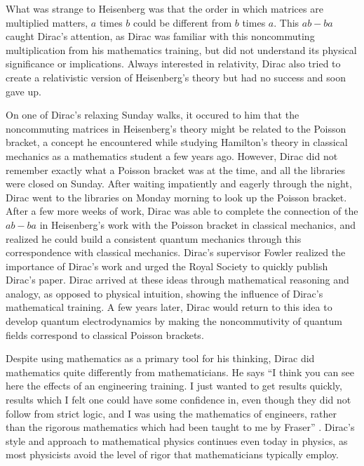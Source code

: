 \documentclass[12pt, oneside, letterpaper, fleqn]{article}
\begin{document}
What was strange to Heisenberg was that the order in which matrices are
multiplied matters, $a$ times $b$ could be different from $b$ times $a$.
This $ab - ba$ caught Dirac's attention, as Dirac was familiar with this
noncommuting multiplication from his mathematics training, but did not
understand its physical significance or implications. Always interested
in relativity, Dirac also tried to create a relativistic version of
Heisenberg's theory but had no success and soon gave up.

On one of Dirac's relaxing Sunday walks, it occured to him that the
noncommuting matrices in Heisenberg's theory might be related to the
Poisson bracket, a concept he encountered while studying Hamilton's
theory in classical mechanics as a mathematics student a few years ago.
However, Dirac did not remember exactly what a Poisson bracket was at
the time, and all the libraries were closed on Sunday. After waiting
impatiently and eagerly through the night, Dirac went to the libraries
on Monday morning to look up the Poisson bracket. After a few more weeks
of work, Dirac was able to complete the connection of the $ab - ba$ in
Heisenberg's work with the Poisson bracket in classical mechanics, and
realized he could build a consistent quantum mechanics through this
correspondence with classical mechanics. Dirac's supervisor Fowler
realized the importance of Dirac's work and urged the Royal Society to
quickly publish Dirac's paper. Dirac arrived at these ideas through
mathematical reasoning and analogy, as opposed to physical intuition,
showing the influence of Dirac's mathematical training. A few years
later, Dirac would return to this idea to develop quantum
electrodynamics by making the noncommutivity of quantum fields
correspond to classical Poisson brackets.

Despite using mathematics as a primary tool for his thinking, Dirac did
mathematics quite differently from mathematicians. He says ``I think you
can see here the effects of an engineering training. I just wanted to
get results quickly, results which I felt one could have some confidence
in, even though they did not follow from strict logic, and I was using
the mathematics of engineers, rather than the rigorous mathematics which
had been taught to me by Fraser'' \cite[pg. 95]{strangest_man}. Dirac's
style and approach to mathematical physics continues even today in
physics, as most physicists avoid the level of rigor that mathematicians
typically employ.

\nocite{*}
%


\end{document}
